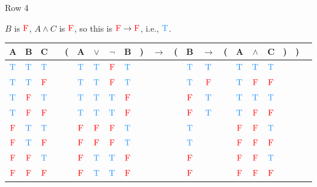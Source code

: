 \documentclass[
  ignorenonframetext,
]{beamer}
\renewcommand{\,}{\text{, }}
\def\True{\textcolor{dodgerblue}{\text{T}}}
\def\False{\textcolor{red}{\text{F}}}
\begin{document}
\begin{frame}{Row 4}
\protect\hypertarget{row-4}{}

\(B\) is \(\False\), \(A \wedge C\) is \(\False\), so this is
\(\False \rightarrow \False\), i.e., \(\True\).

\begin{center}
\bigskip
\begin{tabular}{@{ }c@{ }@{ }c@{ }@{ }c | c@{ }@{}c@{}@{ }c@{ }@{ }c@{ }@{ }c@{ }@{ }c@{ }@{}c@{}@{ }c@{ }@{}c@{}@{ }c@{ }@{ }c@{ }@{}c@{}@{ }c@{ }@{ }c@{ }@{ }c@{ }@{}c@{}@{}c@{}@{ }c}
A & B & C &  & ( & A & $\vee$ & $\neg$ & B & ) & $\rightarrow$ & ( & B & $\rightarrow$ & ( & A & $\wedge$ & C & ) & ) & \\
\hline 
 $\True$ & $\True$ & $\True$ &  &  & $\True$ & $\True$ & $\False$ & $\True$ &  &&  & $\True$ & $\True$ &  & $\True$ & $\True$ & $\True$ &  &  & \\
 $\True$ & $\True$ & $\False$ &  &  & $\True$ & $\True$ & $\False$ & $\True$ &  &&  & $\True$ & $\False$ &  & $\True$ & $\False$ & $\False$ &  &  & \\
 $\True$ & $\False$ & $\True$ &  &  & $\True$ & $\True$ & $\True$ & $\False$ &  &&  & $\False$ & $\True$ &  & $\True$ & $\True$ & $\True$ &  &  & \\
 $\True$ & $\False$ & $\False$ &  &  & $\True$ & $\True$ & $\True$ & $\False$ &  &&  & $\False$ & $\True$ &  & $\True$ & $\False$ & $\False$ &  &  & \\
 $\False$ & $\True$ & $\True$ &  &  & $\False$ & $\False$ & $\False$ & $\True$ &  &&  & $\True$ &&  & $\False$ & $\False$ & $\True$ &  &  & \\
 $\False$ & $\True$ & $\False$ &  &  & $\False$ & $\False$ & $\False$ & $\True$ &  &&  & $\True$ &&  & $\False$ & $\False$ & $\False$ &  &  & \\
 $\False$ & $\False$ & $\True$ &  &  & $\False$ & $\True$ & $\True$ & $\False$ &  &&  & $\False$ &&  & $\False$ & $\False$ & $\True$ &  &  & \\
 $\False$ & $\False$ & $\False$ &  &  & $\False$ & $\True$ & $\True$ & $\False$ &  &&  & $\False$ &&  & $\False$ & $\False$ & $\False$ &  &  & \\
\end{tabular}
\bigskip
\end{center}

\end{frame}
\end{document}
